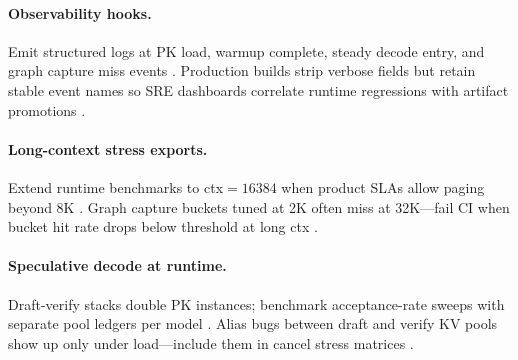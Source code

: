 \paragraph{Observability hooks.} Emit structured logs at PK load, warmup complete, steady decode entry, and graph capture miss events \citep{yirage2026,chen2020compilerbasedhardw,patel2025llminference,taxbreak2026,memoryfloor2026,kwon2023vllm,liu2024deepseekv3,nvidia2024cudagraphs,dao2022flashattention,amd2024xdna,amd2024aie,dao2023flashdecoding,nvidia2022hopper,semianalysis2024tma,dlbook}. Production builds strip verbose fields but retain stable event names so SRE dashboards correlate runtime regressions with artifact promotions \citep{patel2025llminference,yirage2026,chen2020compilerbasedhardw,kwon2023vllm,memoryfloor2026,taxbreak2026,liu2024deepseekv3,nvidia2024cudagraphs,dao2022flashattention,amd2024aie,amd2024xdna,dao2023flashdecoding,nvidia2022hopper,semianalysis2024tma,dlbook}.

\paragraph{Long-context stress exports.} Extend runtime benchmarks to ctx${=}16384$ when product SLAs allow paging beyond 8K \citep{kwon2023vllm,dao2022flashattention,yirage2026,chen2020compilerbasedhardw,patel2025llminference,memoryfloor2026,taxbreak2026,liu2024deepseekv3,nvidia2024cudagraphs,amd2024xdna,amd2024aie,dao2023flashdecoding,nvidia2022hopper,semianalysis2024tma,dlbook}. Graph capture buckets tuned at 2K often miss at 32K---fail CI when bucket hit rate drops below threshold at long ctx \citep{nvidia2024cudagraphs,yirage2026,chen2020compilerbasedhardw,patel2025llminference,memoryfloor2026,taxbreak2026,kwon2023vllm,liu2024deepseekv3,dao2022flashattention,amd2024aie,amd2024xdna,dao2023flashdecoding,nvidia2022hopper,semianalysis2024tma,dlbook}.

\paragraph{Speculative decode at runtime.} Draft-verify stacks double PK instances; benchmark acceptance-rate sweeps with separate pool ledgers per model \citep{patel2025llminference,kwon2023vllm,yirage2026,chen2020compilerbasedhardw,memoryfloor2026,taxbreak2026,liu2024deepseekv3,nvidia2024cudagraphs,dao2022flashattention,amd2024xdna,amd2024aie,dao2023flashdecoding,nvidia2022hopper,semianalysis2024tma,dlbook}. Alias bugs between draft and verify KV pools show up only under load---include them in cancel stress matrices \citep{yirage2026,kwon2023vllm,patel2025llminference,chen2020compilerbasedhardw,memoryfloor2026,taxbreak2026,liu2024deepseekv3,nvidia2024cudagraphs,dao2022flashattention,amd2024aie,amd2024xdna,dao2023flashdecoding,nvidia2022hopper,semianalysis2024tma,dlbook}.

